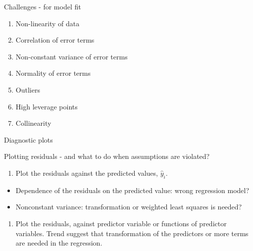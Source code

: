 \documentclass[10pt,ignorenonframetext,]{beamer}
\providecommand{\tightlist}{%
  \setlength{\itemsep}{0pt}\setlength{\parskip}{0pt}}
\begin{document}
\begin{frame}

\begin{block}{Challenges - for model fit}

\begin{enumerate}
\def\labelenumi{\arabic{enumi}.}
\tightlist
\item
  Non-linearity of data
\item
  Correlation of error terms
\item
  Non-constant variance of error terms
\item
  Normality of error terms
\item
  Outliers
\item
  High leverage points
\item
  Collinearity
\end{enumerate}

\end{block}

\end{frame}

\begin{frame}

\begin{block}{Diagnostic plots}

\begin{block}{Plotting residuals - and what to do when assumptions are
violated?}

\begin{enumerate}
\def\labelenumi{\arabic{enumi}.}
\tightlist
\item
  Plot the residuals against the predicted values, \(\hat{y}_i\).
\end{enumerate}

\begin{itemize}
\tightlist
\item
  Dependence of the residuals on the predicted value: wrong regression
  model?
\item
  Nonconstant variance: transformation or weighted least squares is
  needed?
\end{itemize}

\begin{enumerate}
\def\labelenumi{\arabic{enumi}.}
\setcounter{enumi}{1}
\tightlist
\item
  Plot the residuals, against predictor variable or functions of
  predictor variables. Trend suggest that transformation of the
  predictors or more terms are needed in the regression.
\end{enumerate}

\end{block}

\end{block}

\end{frame}
\end{document}
